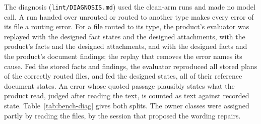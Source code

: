 The diagnosis (\texttt{lint/\allowbreak{}DIAGNOSIS.md}) used the clean-arm runs and made no model call. A run handed over unrouted or routed to another type makes every error of its file a routing error. For a file routed to its type, the product's evaluator was replayed with the designed fact states and the designed attachments, with the product's facts and the designed attachments, and with the designed facts and the product's document findings; the replay that removes the error names its cause. Fed the stored facts and findings, the evaluator reproduced all \sfourdevDiagReplayPlans{} stored plans of the correctly routed files, and fed the designed states, all \sfourdevDiagReplayReferences{} of their reference document states. An error whose quoted passage plausibly states what the product read, judged after reading the text, is counted as text against recorded state. Table~\ref{tab:bench-diag} gives both splits. The owner classes were assigned partly by reading the files, by the session that proposed the wording repairs.

